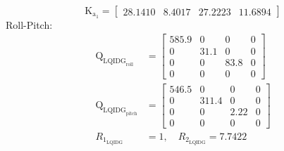 \documentclass[conference]{IEEEtran}
\begin{document}
\begin{equation}
	\boldsymbol{\mathrm{K_{a_1}}} = \begin{bmatrix}
		28.1410 &   8.4017  & 27.2223  & 11.6894
	\end{bmatrix}
\end{equation}
Roll-Pitch:
\begin{equation}
	\begin{split}
		\boldsymbol{\mathrm{Q}}_{{\text{LQIDG}_{\text{roll}}}} &= \begin{bmatrix}
			585.9 &0& 0& 0\\
			0 &  31.1 & 0 &0 \\
			0 & 0 & 83.8 & 0\\
			0 & 0 & 0 & 0
		\end{bmatrix}\\[1em]
	    \boldsymbol{\mathrm{Q}}_{{\text{LQIDG}_{\text{pitch}}}} &= \begin{bmatrix}
		546.5 &0& 0& 0\\
		0 &  311.4 & 0 &0 \\
		0 & 0 & 2.22 & 0\\
		0 & 0 & 0 & 0
		\end{bmatrix}\\[1em]
	 R_{1_{\text{LQIDG}}} &=  1, \quad R_{2_{\text{LQIDG}}} =  7.7422
	\end{split}
\end{equation}
\end{document}
